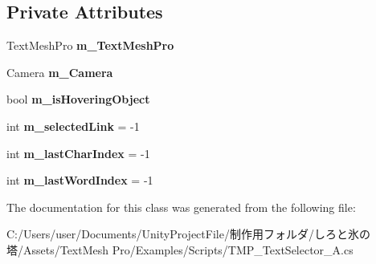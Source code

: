 \subsection*{Private Attributes}
\begin{DoxyCompactItemize}
\item 
\mbox{\label{class_t_m_pro_1_1_examples_1_1_t_m_p___text_selector___a_a6d794381b5ff8bfc42162427f94cd13d}} 
Text\+Mesh\+Pro {\bfseries m\+\_\+\+Text\+Mesh\+Pro}
\item 
\mbox{\label{class_t_m_pro_1_1_examples_1_1_t_m_p___text_selector___a_abfeb964fda5ce70b6641aa50d5d11de1}} 
Camera {\bfseries m\+\_\+\+Camera}
\item 
\mbox{\label{class_t_m_pro_1_1_examples_1_1_t_m_p___text_selector___a_a842bc173daa86a306ab42055af4d9cdc}} 
bool {\bfseries m\+\_\+is\+Hovering\+Object}
\item 
\mbox{\label{class_t_m_pro_1_1_examples_1_1_t_m_p___text_selector___a_a18d127c46880c77a70a680f3b1281024}} 
int {\bfseries m\+\_\+selected\+Link} = -\/1
\item 
\mbox{\label{class_t_m_pro_1_1_examples_1_1_t_m_p___text_selector___a_adeaae9c16325c986ad6ff87b81b77bb3}} 
int {\bfseries m\+\_\+last\+Char\+Index} = -\/1
\item 
\mbox{\label{class_t_m_pro_1_1_examples_1_1_t_m_p___text_selector___a_af3dfb5ac7002e769c990ea22d4171325}} 
int {\bfseries m\+\_\+last\+Word\+Index} = -\/1
\end{DoxyCompactItemize}


The documentation for this class was generated from the following file\+:\begin{DoxyCompactItemize}
\item 
C\+:/\+Users/user/\+Documents/\+Unity\+Project\+File/制作用フォルダ/しろと氷の塔/\+Assets/\+Text\+Mesh Pro/\+Examples/\+Scripts/T\+M\+P\+\_\+\+Text\+Selector\+\_\+\+A.\+cs\end{DoxyCompactItemize}
